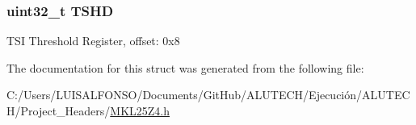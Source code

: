 \subsubsection[{T\+S\+H\+D}]{\setlength{\rightskip}{0pt plus 5cm}uint32\+\_\+t T\+S\+H\+D}\label{struct_t_s_i___mem_map_a85a27c0645c0102ceea4ce506b84194e}
T\+S\+I Threshold Register, offset\+: 0x8 

The documentation for this struct was generated from the following file\+:\begin{DoxyCompactItemize}
\item 
C\+:/\+Users/\+L\+U\+I\+S\+A\+L\+F\+O\+N\+S\+O/\+Documents/\+Git\+Hub/\+A\+L\+U\+T\+E\+C\+H/\+Ejecución/\+A\+L\+U\+T\+E\+C\+H/\+Project\+\_\+\+Headers/\hyperlink{_m_k_l25_z4_8h}{M\+K\+L25\+Z4.\+h}\end{DoxyCompactItemize}
